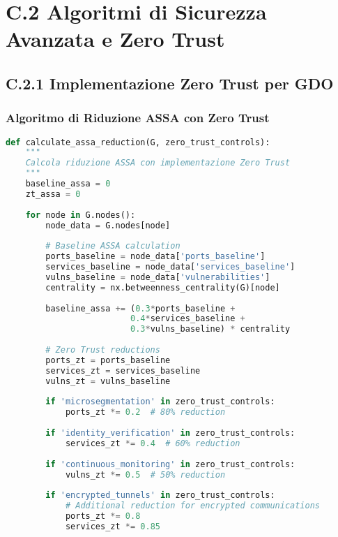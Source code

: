 \section{C.2 Algoritmi di Sicurezza Avanzata e Zero Trust}

\subsection{C.2.1 Implementazione Zero Trust per GDO}

\subsubsection{Algoritmo di Riduzione ASSA con Zero Trust}

\begin{lstlisting}[language=Python, caption=Quantificazione Impatto Zero Trust su ASSA]
def calculate_assa_reduction(G, zero_trust_controls):
    """
    Calcola riduzione ASSA con implementazione Zero Trust
    """
    baseline_assa = 0
    zt_assa = 0
    
    for node in G.nodes():
        node_data = G.nodes[node]
        
        # Baseline ASSA calculation
        ports_baseline = node_data['ports_baseline']
        services_baseline = node_data['services_baseline']
        vulns_baseline = node_data['vulnerabilities']
        centrality = nx.betweenness_centrality(G)[node]
        
        baseline_assa += (0.3*ports_baseline + 
                         0.4*services_baseline + 
                         0.3*vulns_baseline) * centrality
        
        # Zero Trust reductions
        ports_zt = ports_baseline
        services_zt = services_baseline
        vulns_zt = vulns_baseline
        
        if 'microsegmentation' in zero_trust_controls:
            ports_zt *= 0.2  # 80% reduction
            
        if 'identity_verification' in zero_trust_controls:
            services_zt *= 0.4  # 60% reduction
            
        if 'continuous_monitoring' in zero_trust_controls:
            vulns_zt *= 0.5  # 50% reduction
            
        if 'encrypted_tunnels' in zero_trust_controls:
            # Additional reduction for encrypted communications
            ports_zt *= 0.8
            services_zt *= 0.85
        

\end{lstlisting}
